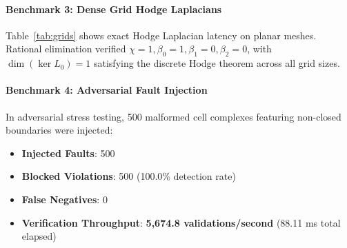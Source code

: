 \documentclass[conference]{IEEEtran}
\begin{document}
\paragraph{Benchmark 3: Dense Grid Hodge Laplacians}
Table~\ref{tab:grids} shows exact Hodge Laplacian latency on planar meshes. Rational elimination verified $\chi = 1, \beta_0 = 1, \beta_1 = 0, \beta_2 = 0$, with $\dim(\ker L_0) = 1$ satisfying the discrete Hodge theorem across all grid sizes.

\begin{table}[htbp]
\centering
\caption{Dense 2D Grid Complexes and Exact Hodge Laplacians}
\label{tab:grids}
\vspace{0.3em}
\end{table}

\paragraph{Benchmark 4: Adversarial Fault Injection}
In adversarial stress testing, 500 malformed cell complexes featuring non-closed boundaries were injected:
\begin{itemize}
    \item \textbf{Injected Faults}: 500
    \item \textbf{Blocked Violations}: 500 (100.0\% detection rate)
    \item \textbf{False Negatives}: 0
    \item \textbf{Verification Throughput}: \textbf{5,674.8 validations/second} (88.11 ms total elapsed)
\end{itemize}
\end{document}
